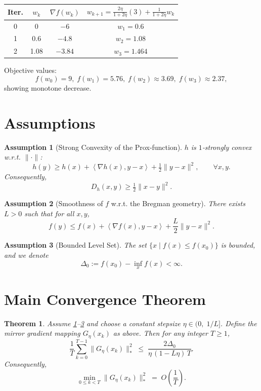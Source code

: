 \documentclass{article}
\newtheorem{theorem}{Theorem}
\newtheorem{assumption}{Assumption}
\newcommand{\inner}[2]{\left\langle #1,#2\right\rangle}
\newcommand{\Breg}[2]{D_{h}(#1,#2)}
\begin{document}
\begin{tabular}{c|c|c|c}
\textbf{Iter.}&$w_{k}$&$\nabla f(w_{k})$&$w_{k+1}= \displaystyle\frac{2\eta}{1+2\eta}(3)+\frac{1}{1+2\eta}w_{k}$\\\hline
0&0&$-6$&$w_{1}=0.6$\\
1&0.6&$-4.8$&$w_{2}=1.08$\\
2&1.08&$-3.84$&$w_{3}=1.464$\\
\end{tabular}

Objective values:
\[
f(w_{0})=9,\; f(w_{1})=5.76,\; f(w_{2})\approx3.69,\; f(w_{3})\approx2.37,
\]
showing monotone decrease.

\section*{Assumptions}
\begin{assumption}[Strong Convexity of the Prox‑function]\label{as:strong}
$h$ is $1$‑strongly convex w.r.t. $\|\cdot\|$:
\[
h(y)\ge h(x)+\inner{\nabla h(x)}{y-x}+\tfrac12\|y-x\|^{2},
\qquad\forall x,y.
\]
Consequently,
\[
\Breg{x}{y}\ge\tfrac12\|x-y\|^{2}.
\]
\end{assumption}

\begin{assumption}[Smoothness of $f$ w.r.t. the Bregman geometry]\label{as:smooth}
There exists $L>0$ such that for all $x,y$,
\[
f(y)\le f(x)+\inner{\nabla f(x)}{y-x}+\frac{L}{2}\|y-x\|^{2}.
\]
\end{assumption}

\begin{assumption}[Bounded Level Set]\label{as:bound}
The set $\{x\mid f(x)\le f(x_{0})\}$ is bounded, and we denote
\[
\Delta_{0}:=f(x_{0})-\inf_{x}f(x)<\infty .
\]
\end{assumption}

\section*{Main Convergence Theorem}
\begin{theorem}\label{thm:main}
Assume \ref{as:strong}–\ref{as:bound} and choose a constant stepsize
$\eta\in\big(0,\;1/L\big]$.
Define the mirror gradient mapping $G_{\eta}(x_{k})$ as above.
Then for any integer $T\ge1$,
\[
\frac{1}{T}\sum_{k=0}^{T-1}\|G_{\eta}(x_{k})\|_{*}^{2}
\;\le\;
\frac{2\Delta_{0}}{\eta\,(1-L\eta)\,T}.
\]
Consequently,
\[
\min_{0\le k<T}\|G_{\eta}(x_{k})\|_{*}^{2}
\;=\;O\!\left(\frac{1}{T}\right).
\]
\end{theorem}
\end{document}

